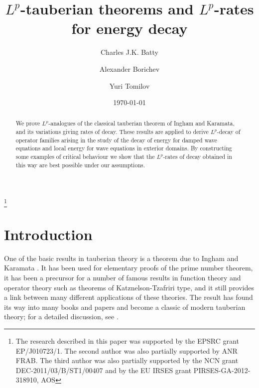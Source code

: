 \documentclass[11pt]{amsart}
\theoremstyle{definition}
\theoremstyle{remark}
\numberwithin{equation}{section}
\begin{document}
\title[$L^p$-tauberian theorems and $L^p$-rates]{$L^p$-tauberian theorems and $L^p$-rates for energy decay}
\author{Charles J.K. Batty}
\address{St. John's College, University of Oxford, Oxford OX1 3JP, United Kingdom}

\author{Alexander Borichev}
\address{Institut de Math\'ematiques de Marseille, Aix Marseille Universit\'e, CNRS, Centrale Marseille, 39 rue F.~Joliot-Curie,
13453 Marseille, France}

\author{Yuri Tomilov}
\address{Department of Mathematics and Computer Science, Nicolas Copernicus University, ul.\ Chopina 12/18, 87-100 Torun, Poland and Institute of Mathematics, Polish Academy of Sciences,
\' Sniadeckich str.8, 00-956 Warsaw, Poland}

\date{\today}

\thanks{The research described in this paper was supported by the EPSRC grant EP/J010723/1. The second author was also partially supported by ANR FRAB. The third author was also partially supported by the NCN grant DEC-2011/03/B/ST1/00407 and by the EU IRSES grant PIRSES-GA-2012-318910, AOS}


\begin{abstract}
We prove $L^p$-analogues of the classical tauberian theorem of
Ingham and Karamata, and its variations giving rates of decay.
These
results are applied to derive $L^p$-decay of operator families arising
in the study of
the decay of energy for damped wave equations and local
energy for wave equations in exterior domains.
By constructing some
examples of critical behaviour we show that the $L^p$-rates of decay
obtained in this way
are best possible under our assumptions.
\end{abstract}
\maketitle

\section{Introduction}
One of the basic results in tauberian theory is a theorem due to Ingham \cite{In35} and Karamata \cite{Ka34}.  It has been used for elementary proofs of the prime number theorem, it has been a precursor for a number of famous results in function theory and operator theory such as theorems of Katznelson-Tzafriri type, and it still provides a link between many different applications of these theories. The result has found its way into many books and papers and become a classic of modern tauberian theory; for a detailed discussion, see \cite{Ko04}.
\end{document}
